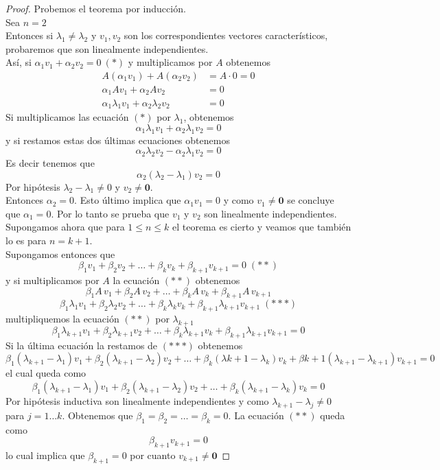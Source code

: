 \documentclass[10pt,a4paper]{report}
\theoremstyle{definition}
\theoremstyle{remark}
\numberwithin{section}{chapter}
\numberwithin{equation}{chapter}
\numberwithin{tacounter}{chapter}
\begin{document}
\begin{proof}
Probemos el teorema por inducción.\\
Sea $n=2$\\
Entonces si $\lambda_1 \neq \lambda_2$ y $v_1 , v_2$ son los correspondientes vectores característicos, probaremos que son linealmente independientes.\\
Así, si $\alpha_1 v_1 + \alpha_2 v_2 = 0 \: (*)$ y multiplicamos por $A$ obtenemos 
\begin{align*}
A(\alpha_1 v_1) + A(\alpha_2 v_2) &= A \cdot 0 = 0\\
\alpha_1 A v_1 + \alpha_2 A v_2 &=0\\
\alpha_1 \lambda_1 v_1 + \alpha_2 \lambda_2 v_2 &= 0
\end{align*}
Si multiplicamos las ecuación $(*)$ por $\lambda_1$, obtenemos
$$\alpha_1 \lambda_1 v_1 + \alpha_2 \lambda_1 v_2 = 0$$
y si restamos estas dos últimas ecuaciones obtenemos $$\alpha_2 \lambda_2 v_2 - \alpha_2 \lambda_1 v_2 = 0$$
Es decir tenemos que $$\alpha_2 (\lambda_2 - \lambda_1)v_2 = 0$$
Por hipótesis $\lambda_2 -\lambda_1 \neq 0$ y $v_2 \neq \mathbf{0}$.\\
Entonces $\alpha_2 = 0$. Esto último implica que $\alpha_1 v_1 =0$ y como $v_1 \neq \mathbf{0}$ se concluye que $\alpha_1 =0$. Por lo tanto se prueba que $v_1$ y $v_2$ son linealmente independientes.\\
Supongamos ahora que para $1\leq n \leq k$ el teorema es cierto y veamos que también lo es para $n =k+1$.\\
Supongamos entonces que 
$$\beta_1 v_1 +\beta_2 v_2 + \ldots + \beta_k v_k + \beta_{k+1} v_{k+1}= 0\;(**)$$
y si multiplicamos por $A$ la ecuación $(**)$ obtenemos
$$\beta_1 A\, v_1 + \beta_2 A\, v_2 + \ldots +\beta_k A\, v_k + \beta_{k+1} A\, v_{k+1}$$
$$\beta_1 \lambda_1 v_1 + \beta_2 \lambda_2 v_2 + \ldots + \beta_k \lambda_k v_k + \beta_{k+1} \lambda_{k+1} v_{k+1}\; (***)$$
multipliquemos la ecuación $(**)$ por $\lambda_{k+1}$
$$\beta_1 \lambda_{k+1} v_1 + \beta_{2} \lambda_{k+1} v_2 + \ldots + \beta_{k} \lambda_{k+1} v_k + \beta_{k+1} \lambda_{k+1} v_{k+1} = 0$$
Si la última ecuación la restamos de $(***)$ obtenemos
$$\beta_1 (\lambda_{k+1} - \lambda_1)v_1 + \beta_2(\lambda_{k+1}- \lambda_2)v_2 + \ldots + \beta_k (\lambda{k+1} - \lambda_k)v_k + \beta{k+1}(\lambda_{k+1} - \lambda_{k+1})v_{k+1} =0$$
el cual queda como
$$\beta_1(\lambda_{k+1}-\lambda_1)v_1 + \beta_2 (\lambda_{k+1} - \lambda_2)v_2 + \ldots + \beta_k(\lambda_{k+1}-\lambda_k)v_k =0$$
Por hipótesis inductiva  son linealmente independientes y como $\lambda_{k+1}-\lambda_j \neq 0$ para $j = 1 \ldots k$. Obtenemos que $\beta_1 = \beta_2 = \ldots = \beta_k =0$.
La ecuación $(**)$ queda como
$$\beta_{k+1} v_{k+1} =0$$
lo cual implica que $\beta_{k+1}=0$ por cuanto $v_{k+1}\neq \mathbf{0}$
\end{proof}
\end{document}
